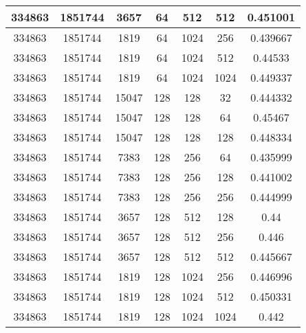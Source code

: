 \documentclass[9pt]{article}
\begin{document}
\begin{tabular}{|c|c|c|c|c|c|c| }
334863  & 1851744  & 3657  & 64  & 512  & 512  & 0.451001 \\
\hline
334863  & 1851744  & 1819  & 64  & 1024  & 256  & 0.439667 \\
\hline
334863  & 1851744  & 1819  & 64  & 1024  & 512  & 0.44533 \\
\hline
334863  & 1851744  & 1819  & 64  & 1024  & 1024  & 0.449337 \\
\hline
334863  & 1851744  & 15047  & 128  & 128  & 32  & 0.444332 \\
\hline
334863  & 1851744  & 15047  & 128  & 128  & 64  & 0.45467 \\
\hline
334863  & 1851744  & 15047  & 128  & 128  & 128  & 0.448334 \\
\hline
334863  & 1851744  & 7383  & 128  & 256  & 64  & 0.435999 \\
\hline
334863  & 1851744  & 7383  & 128  & 256  & 128  & 0.441002 \\
\hline
334863  & 1851744  & 7383  & 128  & 256  & 256  & 0.444999 \\
\hline
334863  & 1851744  & 3657  & 128  & 512  & 128  & 0.44 \\
\hline
334863  & 1851744  & 3657  & 128  & 512  & 256  & 0.446 \\
\hline
334863  & 1851744  & 3657  & 128  & 512  & 512  & 0.445667 \\
\hline
334863  & 1851744  & 1819  & 128  & 1024  & 256  & 0.446996 \\
\hline
334863  & 1851744  & 1819  & 128  & 1024  & 512  & 0.450331 \\
\hline
334863  & 1851744  & 1819  & 128  & 1024  & 1024  & 0.442 \\
\hline
\end{tabular}
 
\end{document}
